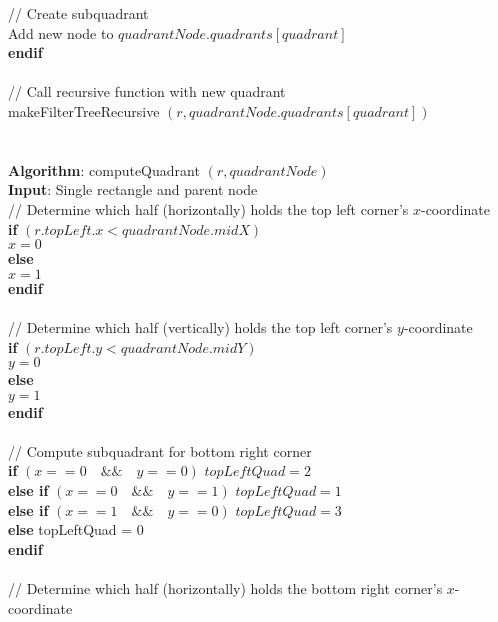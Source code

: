 \documentclass{article}
\begin{document}
	\indent \indent // Create subquadrant \\
	\indent \indent Add new node to $quadrantNode.quadrants[quadrant]$ \\
	\indent \textbf{endif} \\ 
	\\
	\indent // Call recursive function with new quadrant \\
	\indent makeFilterTreeRecursive $(r, quadrantNode.quadrants[quadrant])$ \\ 
	\\ 
	\\
	\textbf{Algorithm}: computeQuadrant $(r, quadrantNode)$ \\
	\textbf{Input}: Single rectangle and parent node \\
	\indent // Determine which half (horizontally) holds the top left corner's $x$-coordinate \\
	\indent \textbf{if} $(r.topLeft.x < quadrantNode.midX)$ \\
	\indent \indent $x = 0$ \\
	\indent \textbf{else} \\
	\indent \indent $x = 1$ \\ 
	\indent \textbf{endif} \\ 
	\\
	\indent // Determine which half (vertically) holds the top left corner's $y$-coordinate \\
	\indent \textbf{if} $(r.topLeft.y < quadrantNode.midY)$ \\
	\indent \indent $y = 0$ \\
	\indent \textbf{else} \\
	\indent \indent $y = 1$ \\
	\indent \textbf{endif} \\
	\\
	\indent // Compute subquadrant for bottom right corner \\
	\indent \textbf{if} $(x == 0 \quad  \&\&  \quad y == 0)$ $topLeftQuad = 2$ \\
	\indent \textbf{else if} $(x == 0  \quad \&\&  \quad y == 1)$ $topLeftQuad = 1$ \\
	\indent \textbf{else if} $(x == 1 \quad  \&\&  \quad y == 0)$ $topLeftQuad = 3$ \\
	\indent \textbf{else} topLeftQuad = 0 \\
	\indent \textbf{endif} \\
	\\
	\indent // Determine which half (horizontally) holds the bottom right corner's $x$-coordinate \\
\end{document}
